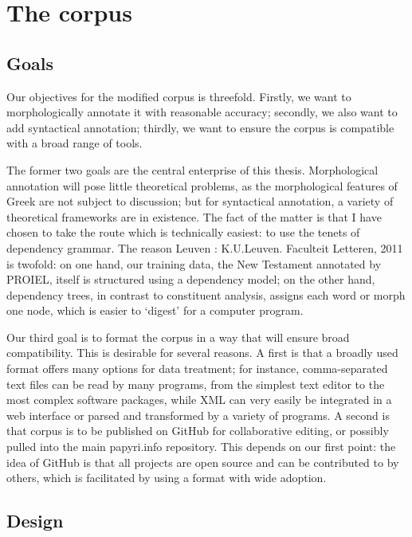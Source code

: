 \chapter{The corpus}
\label{chp:design}
\minitoc\mtcskip
\section{Goals}

Our objectives for the modified corpus is threefold. Firstly, we want to
morphologically annotate it with reasonable accuracy; secondly, we also want to
add syntactical annotation; thirdly, we want to ensure the corpus is compatible
with a broad range of tools.

The former two goals are the central enterprise of this thesis. Morphological
annotation will pose little theoretical problems, as the morphological features
of Greek are not subject to discussion; but for syntactical annotation, a
variety of theoretical frameworks are in existence. The fact of the matter is
that I have chosen to take the route which is technically easiest: to use the
tenets of dependency grammar. The reason Leuven : K.U.Leuven. Faculteit Letteren, 2011 is twofold: on one hand, our training
data, the New Testament annotated by PROIEL, itself is structured using a
dependency model; on the other hand, dependency trees, in contrast to
constituent analysis, assigns each word or morph one node, which is easier to
`digest' for a computer program.

Our third goal is to format the corpus in a way that will ensure broad
compatibility. This is desirable for several reasons. A first is that a broadly
used format offers many options for data treatment; for instance,
comma-separated text files can be read by many programs, from the simplest text
editor to the most complex software packages, while XML can very easily be
integrated in a web interface or parsed and transformed by a variety of
programs. A second is that corpus is to be published on GitHub for
collaborative editing, or possibly pulled into the main papyri.info repository.
This depends on our first point: the idea of GitHub is that all projects are
open source and can be contributed to by others, which is facilitated by using a
format with wide adoption.

\section{Design}
